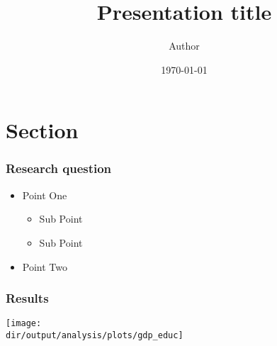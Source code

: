 \documentclass{beamer}
\title{Presentation title}
\author{Author}
\institute{Affiliation}
\date{\today}
\newcommand*{\dir}{.}
\renewcommand*{\dir}{./../..}
\begin{document}
\frame{\titlepage}

\section{Section}

\begin{frame}
\frametitle{Research question}
\begin{itemize}
	\item Point One 
	\begin{itemize}
		\item Sub Point
		\item Sub Point  
	\end{itemize}
 	\item Point Two
\end{itemize}
\end{frame}

\begin{frame}
\frametitle{Results}
\begin{centering}
\medskip{}
\par\end{centering}
\begin{centering}
\texttt{[image: \\dir/output/analysis/plots/gdp\_educ]}\medskip{}
\par\end{centering}
\end{frame}
\end{document}
